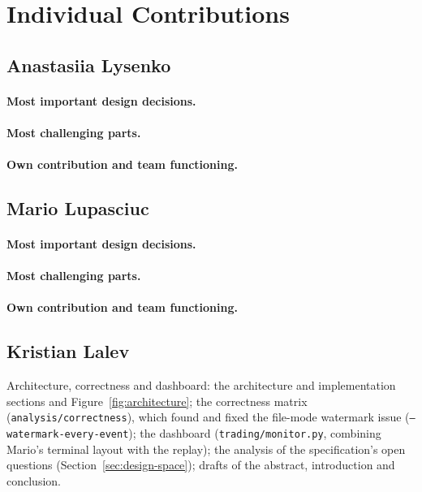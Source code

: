 \section{Individual Contributions}
\label{sec:contributions}

\subsection{Anastasiia Lysenko}
\paragraph{Most important design decisions.} 
\paragraph{Most challenging parts.} 
\paragraph{Own contribution and team functioning.} 

\subsection{Mario Lupasciuc}
\paragraph{Most important design decisions.} 
\paragraph{Most challenging parts.} 
\paragraph{Own contribution and team functioning.} 

\subsection{Kristian Lalev}
Architecture, correctness and dashboard: the architecture and implementation sections and
Figure~\ref{fig:architecture}; the correctness matrix (\texttt{analysis/correctness}), which found and fixed the
file-mode watermark issue (\texttt{--watermark-every-event}); the dashboard (\texttt{trading/monitor.py}, combining Mario's terminal layout with the replay); the
analysis of the specification's open questions (Section~\ref{sec:design-space}); drafts of the abstract,
introduction and conclusion.
